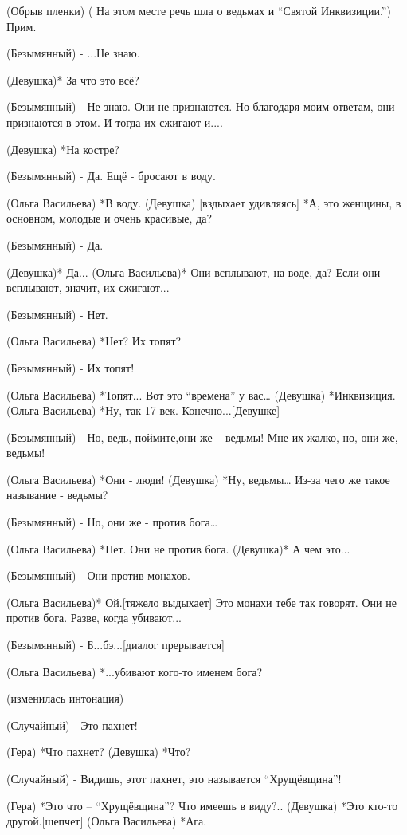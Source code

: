 (Обрыв пленки) 
      ( На этом месте речь шла о ведьмах и “Святой Инквизиции.”) Прим.

(Безымянный) - ...Не знаю.

(Девушка)* За что это всё?

(Безымянный) - Не знаю. Они не признаются. Но благодаря моим ответам, они признаются в этом. И тогда их сжигают и....

(Девушка) *На костре?

(Безымянный) - Да. Ещё -  бросают в воду.

(Ольга Васильева) *В воду.
(Девушка) [вздыхает удивляясь] *А, это женщины, в основном, молодые и очень красивые, да?

(Безымянный) - Да.

(Девушка)* Да...
(Ольга Васильева)* Они всплывают, на воде, да? Если они всплывают, значит, их сжигают...

(Безымянный) - Нет.

(Ольга Васильева) *Нет? Их топят?

(Безымянный) - Их топят!

(Ольга Васильева) *Топят... Вот это “времена” у вас…
(Девушка) *Инквизиция.
(Ольга Васильева) *Ну, так 17 век. Конечно...[Девушке]

(Безымянный) - Но, ведь, поймите,они же – ведьмы! Мне их жалко, но, они же, ведьмы!

(Ольга Васильева) *Они - люди!
(Девушка) *Ну, ведьмы… Из-за чего же такое называние - ведьмы?

(Безымянный) - Но, они же - против бога…

(Ольга Васильева) *Нет. Они не против бога.
(Девушка)* А чем это...

(Безымянный) - Они против монахов.

(Ольга Васильева)* Ой.[тяжело выдыхает] Это монахи тебе так говорят. Они не против бога. Разве,  когда убивают...

(Безымянный) - Б...бэ...[диалог прерывается] 

(Ольга Васильева) *...убивают кого-то именем бога?

(изменилась интонация)

(Случайный) - Это пахнет!

(Гера) *Что пахнет?
(Девушка) *Что?

(Случайный) - Видишь, этот пахнет, это называется “Хрущёвщина”!

(Гера) *Это что – “Хрущёвщина”? Что имеешь в виду?..
(Девушка) *Это кто-то другой.[шепчет]
(Ольга Васильева) *Ага.

